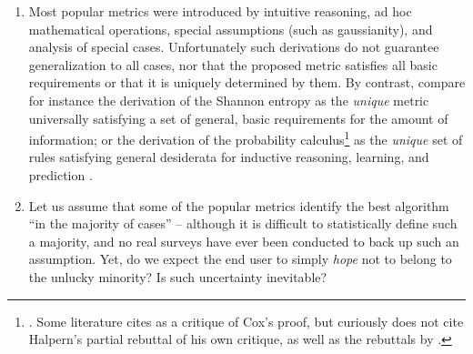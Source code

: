 \documentclass[\ifafour a4paper,12pt,\else a5paper,10pt,\fi%
onecolumn,oneside,article,%
british%
]{memoir}
\theoremstyle{remark}
\theoremstyle{innote}
\renewcommand*{\|}[1][]{\nonscript\:#1\vert\nonscript\:\mathopen{}}
\newcommand*{\sect}{\S}%
\newcommand*{\chap}{ch.}%
\newcommand*{\chaps}{chs}%
\begin{document}
\begin{enumerate}
\item\label{item:ad_hoc} Most popular metrics were introduced by intuitive reasoning, ad hoc mathematical operations, special assumptions (such as gaussianity\autocites[e.g.][\sect~31 p.~183 for the Matthews correlation coefficient]{fisher1925_r1963}), and analysis of special cases. Unfortunately such derivations do not guarantee generalization to all cases, nor that the proposed metric satisfies all basic requirements or that it is uniquely determined by them. By contrast, compare for instance the derivation of the Shannon entropy \autocites{shannon1948}[\sect~3.2]{woodward1953_r1964}[also][]{goodetal1968} as the \emph{unique} metric universally satisfying a set of general, basic requirements for the amount of information; or the derivation of the probability calculus\footnote{\cites{cox1946,fine1973}[\chaps~1--2]{jaynes1994_r2003}. Some literature cites \cite{halpern1999} as a critique of Cox's proof, but curiously does not cite Halpern's \cite*{halpern1999b} partial rebuttal of his own critique, as well as the rebuttals by \cite{snow1998,snow2001}.} as the \emph{unique} set of rules satisfying general desiderata for inductive reasoning, learning, and prediction \autocites{selfetal1987,cheeseman1988}[\chap~12]{russelletal1995_r2022}.
  
\item\label{item:hope_medical} Let us assume that some of the popular metrics identify the best algorithm \enquote{in the majority of cases} -- although it is difficult to statistically define such a majority, and no real surveys have ever been conducted to back up such an assumption. Yet, do we expect the end user to simply \emph{hope} not to belong to the unlucky minority? Is such uncertainty inevitable?


\end{enumerate}
\end{document}
